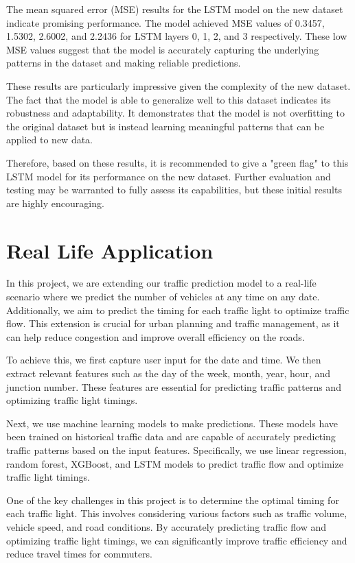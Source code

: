 \documentclass{IEEEtran}
\begin{document}
The mean squared error (MSE) results for the LSTM model on the new dataset indicate promising performance. The model achieved MSE values of 0.3457, 1.5302, 2.6002, and 2.2436 for LSTM layers 0, 1, 2, and 3 respectively. These low MSE values suggest that the model is accurately capturing the underlying patterns in the dataset and making reliable predictions.

These results are particularly impressive given the complexity of the new dataset. The fact that the model is able to generalize well to this dataset indicates its robustness and adaptability. It demonstrates that the model is not overfitting to the original dataset but is instead learning meaningful patterns that can be applied to new data.

Therefore, based on these results, it is recommended to give a "green flag" to this LSTM model for its performance on the new dataset. Further evaluation and testing may be warranted to fully assess its capabilities, but these initial results are highly encouraging.

\section{Real Life Application}

In this project, we are extending our traffic prediction model to a real-life scenario where we predict the number of vehicles at any time on any date. Additionally, we aim to predict the timing for each traffic light to optimize traffic flow. This extension is crucial for urban planning and traffic management, as it can help reduce congestion and improve overall efficiency on the roads.

To achieve this, we first capture user input for the date and time. We then extract relevant features such as the day of the week, month, year, hour, and junction number. These features are essential for predicting traffic patterns and optimizing traffic light timings.

Next, we use machine learning models to make predictions. These models have been trained on historical traffic data and are capable of accurately predicting traffic patterns based on the input features. Specifically, we use linear regression, random forest, XGBoost, and LSTM models to predict traffic flow and optimize traffic light timings.

One of the key challenges in this project is to determine the optimal timing for each traffic light. This involves considering various factors such as traffic volume, vehicle speed, and road conditions. By accurately predicting traffic flow and optimizing traffic light timings, we can significantly improve traffic efficiency and reduce travel times for commuters.
\end{document}
